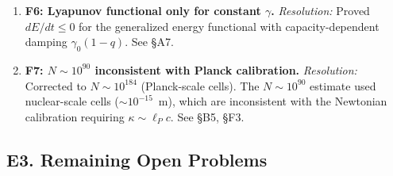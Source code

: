 \documentclass[reprint]{revtex4-2}
\begin{document}
\begin{enumerate}[leftmargin=*]
\item \textbf{F6: Lyapunov functional only for constant $\gamma$.} \textit{Resolution:} Proved $dE/dt \le 0$ for the generalized energy functional with capacity-dependent damping $\gamma_0(1-q)$. See \S A7.

\item \textbf{F7: $N\sim 10^{90}$ inconsistent with Planck calibration.} \textit{Resolution:} Corrected to $N\sim 10^{184}$ (Planck-scale cells). The $N\sim 10^{90}$ estimate used nuclear-scale cells ($\sim 10^{-15}$~m), which are inconsistent with the Newtonian calibration requiring $\kappa \sim \ell_P c$. See \S B5, \S F3.
\end{enumerate}

\subsection{E3. Remaining Open Problems}
\end{document}
